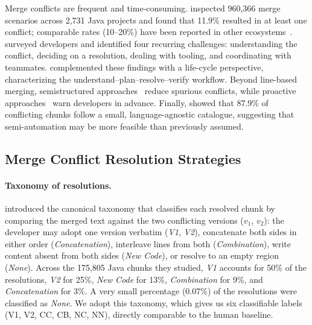 \documentclass[sigconf,anonymous]{acmart}
\begin{document}
Merge conflicts are frequent and time-consuming. \citet{ghiotto2020nature} inspected 960{,}366 merge scenarios across 2{,}731 Java projects and found that 11.9\% resulted in at least one conflict; comparable rates (10--20\%) have been reported in other ecosystems~\cite{vale2022challenges,lessenich2018indicators}. \citet{vale2022challenges} surveyed developers and identified four recurring challenges: understanding the conflict, deciding on a resolution, dealing with tooling, and coordinating with teammates. \citet{nelson2019lifecycle} complemented these findings with a life-cycle perspective, characterizing the understand--plan--resolve--verify workflow. Beyond line-based merging, semistructured approaches~\cite{apel2011semistructured,cavalcanti2019,accioly2018semistructured} reduce spurious conflicts, while proactive approaches~\cite{brun2011proactive,kasi2013cassandra} warn developers in advance. Finally, \citet{boll2024semi} showed that 87.9\% of conflicting chunks follow a small, language-agnostic catalogue, suggesting that semi-automation may be more feasible than previously assumed.

\subsection{Merge Conflict Resolution Strategies}
\label{sec:bg-strategies}

\paragraph{Taxonomy of resolutions.}
\citet{ghiotto2020nature} introduced the canonical taxonomy that classifies each resolved chunk by comparing the merged text against the two conflicting versions ($v_1$, $v_2$): the developer may adopt one version verbatim (\textit{V1}, \textit{V2}), concatenate both sides in either order (\textit{Concatenation}), interleave lines from both (\textit{Combination}), write content absent from both sides (\textit{New Code}), or resolve to an empty region (\textit{None}). %
Across the 175{,}805 Java chunks they studied, \textit{V1} accounts for 50\% of the resolutions, \textit{V2} for 25\%, \textit{New Code} for 13\%, \textit{Combination} for 9\%, and \textit{Concatenation} for 3\%. A very small percentage (0.07\%) of the resolutions were classified as \textit{None}. We adopt this taxonomy, which gives us six classifiable labels (V1, V2, CC, CB, NC, NN), directly comparable to the human baseline.
\end{document}
